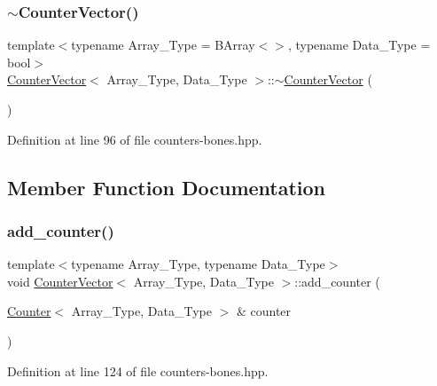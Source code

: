 \subsubsection{\texorpdfstring{$\sim$\+Counter\+Vector()}{~CounterVector()}}
{\footnotesize\ttfamily template$<$typename Array\+\_\+\+Type = B\+Array$<$$>$, typename Data\+\_\+\+Type = bool$>$ \\
\hyperlink{class_counter_vector}{Counter\+Vector}$<$ Array\+\_\+\+Type, Data\+\_\+\+Type $>$\+::$\sim$\hyperlink{class_counter_vector}{Counter\+Vector} (\begin{DoxyParamCaption}{ }\end{DoxyParamCaption})\hspace{0.3cm}{\ttfamily [inline]}}



Definition at line 96 of file counters-\/bones.\+hpp.



\subsection{Member Function Documentation}
\mbox{\label{class_counter_vector_a34fda06ff678691daf3b0455c1a2af48}} 
\subsubsection{\texorpdfstring{add\+\_\+counter()}{add\_counter()}\hspace{0.1cm}{\footnotesize\ttfamily [1/3]}}
{\footnotesize\ttfamily template$<$typename Array\+\_\+\+Type, typename Data\+\_\+\+Type$>$ \\
void \hyperlink{class_counter_vector}{Counter\+Vector}$<$ Array\+\_\+\+Type, Data\+\_\+\+Type $>$\+::add\+\_\+counter (\begin{DoxyParamCaption}\item[{\hyperlink{class_counter}{Counter}$<$ Array\+\_\+\+Type, Data\+\_\+\+Type $>$ \&}]{counter }\end{DoxyParamCaption})\hspace{0.3cm}{\ttfamily [inline]}}



Definition at line 124 of file counters-\/bones.\+hpp.

\mbox{\label{class_counter_vector_a062d52e18f1d3ba4c00cbf4c2d89f1e7}} 
